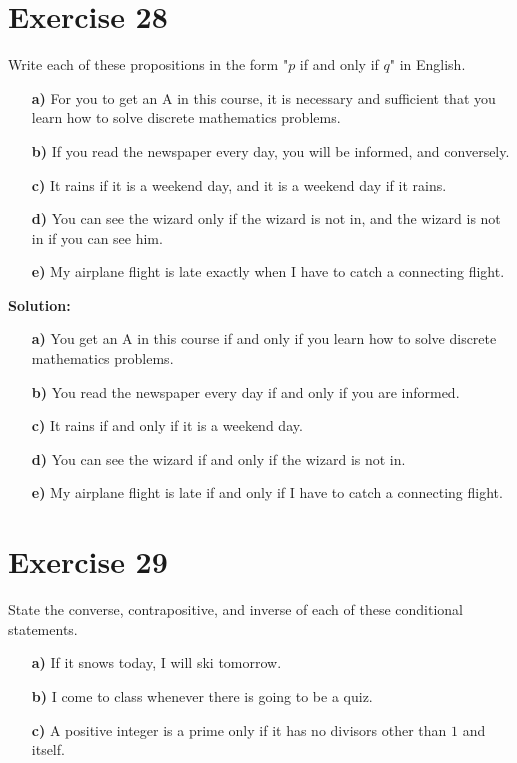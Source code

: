 \documentclass{Axon}
\begin{document}
\section*{Exercise 28}
Write each of these propositions in the form "\(p\) if and only if \(q\)" in English.
\begin{enumerate}
    \item[\textbf{a)}] For you to get an A in this course, it is necessary and sufficient that you learn how to solve discrete mathematics problems.
    \item[\textbf{b)}] If you read the newspaper every day, you will be informed, and conversely.
    \item[\textbf{c)}] It rains if it is a weekend day, and it is a weekend day if it rains.
    \item[\textbf{d)}] You can see the wizard only if the wizard is not in, and the wizard is not in if you can see him.
    \item[\textbf{e)}] My airplane flight is late exactly when I have to catch a connecting flight. 
\end{enumerate}

\noindent
\textbf{Solution:}
\begin{enumerate}
    \item[\textbf{a)}] You get an A in this course if and only if you learn how to solve discrete mathematics problems.
    \item[\textbf{b)}] You read the newspaper every day if and only if you are informed.
    \item[\textbf{c)}] It rains if and only if it is a weekend day.
    \item[\textbf{d)}] You can see the wizard if and only if the wizard is not in.
    \item[\textbf{e)}] My airplane flight is late if and only if I have to catch a connecting flight.
\end{enumerate}

\section*{Exercise 29}
State the converse, contrapositive, and inverse of each of these conditional statements.
\begin{enumerate}
    \item[\textbf{a)}] If it snows today, I will ski tomorrow.
    \item[\textbf{b)}] I come to class whenever there is going to be a quiz.
    \item[\textbf{c)}] A positive integer is a prime only if it has no divisors other than \(1\) and itself.
\end{enumerate}
\end{document}

